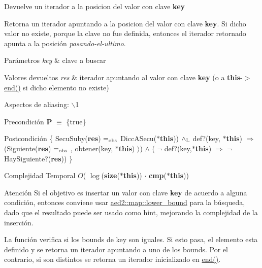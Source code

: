\-Devuelve un iterador a la posicion del valor con clave {\bfseries key} 

\-Retorna un iterador apuntando a la posicion del valor con clave {\bfseries key}. \-Si dicho valor no existe, porque la clave no fue definida, entonces el iterador retornado apunta a la posición {\itshape pasando-\/el-\/ultimo\/}.


\begin{DoxyParams}{\-Parámetros}
{\em key} & clave a buscar \\
\hline
\end{DoxyParams}

\begin{DoxyRetVals}{\-Valores devueltos}
{\em res} & iterador apuntando al valor con clave {\bfseries key} (o a {\bfseries this}-\/$>$\hyperlink{classaed2_1_1map_a76023e6a56cb625513e1b5ea028bf983_a76023e6a56cb625513e1b5ea028bf983}{end()} si dicho elemento no existe)\\
\hline
\end{DoxyRetVals}
\begin{DoxyParagraph}{\-Aspectos de aliasing\-:}
$\backslash$1
\end{DoxyParagraph}
\begin{DoxyPrecond}{\-Precondición}
{\bfseries \-P} $\equiv$ \{true\}
\end{DoxyPrecond}
\begin{DoxyPostcond}{\-Postcondición}
\{ \-Secu\-Suby({\bfseries res}) $=_{\rm obs}$ \-Dicc\-A\-Secu({\bfseries $\ast$this})) $\land_{\rm L}$ def?(key, {\bfseries $\ast$this}) $\Rightarrow$ (\-Siguiente({\bfseries res}) $=_{\rm obs}$ , obtener(key, {\bfseries $\ast$this}) $\rangle$) $\land$ ( $\lnot$ def?(key,{\bfseries $\ast$this}) $\Rightarrow$ $\lnot$ \-Hay\-Siguiente?({\bfseries res})) \}
\end{DoxyPostcond}

\begin{DoxyDescription}
\item[\-Complejidad \-Temporal]$O$( $\log$({\bfseries size}({\bfseries $\ast$this})) $\cdot$ {\bfseries cmp}({\bfseries $\ast$this}))
\end{DoxyDescription}

\begin{DoxyAttention}{\-Atención}
\-Si el objetivo es insertar un valor con clave {\bfseries key} de acuerdo a alguna condición, entonces conviene usar \hyperlink{classaed2_1_1map_a3399d36fdd5a880b494f3a5795d3f18f_a3399d36fdd5a880b494f3a5795d3f18f}{aed2\-::map\-::lower\-\_\-bound} para la búsqueda, dado que el resultado puede ser usado como hint, mejorando la complejidad de la inserción.
\end{DoxyAttention}
\-La función verifica si los bounds de key son iguales. \-Si esto pasa, el elemento esta definido y se retorna un iterador apuntando a uno de los bounds. \-Por el contrario, si son distintos se retorna un iterador inicializado en \hyperlink{classaed2_1_1map_a76023e6a56cb625513e1b5ea028bf983_a76023e6a56cb625513e1b5ea028bf983}{end()}. 

